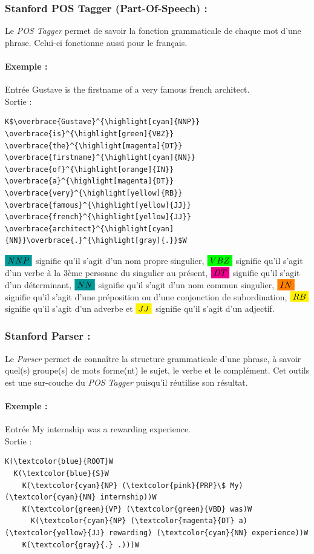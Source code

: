             \subsubsection{Stanford POS Tagger (Part-Of-Speech) :}
                Le \textit{POS Tagger} permet de savoir la fonction grammaticale de chaque mot d'une phrase. Celui-ci fonctionne aussi pour le français.

                \paragraph{Exemple :}
                    Entrée \og Gustave is the firstname of a very famous french architect.\fg\\
                    Sortie :
\begin{lstlisting}
K$\overbrace{Gustave}^{\highlight[cyan]{NNP}} \overbrace{is}^{\highlight[green]{VBZ}} \overbrace{the}^{\highlight[magenta]{DT}} \overbrace{firstname}^{\highlight[cyan]{NN}} \overbrace{of}^{\highlight[orange]{IN}} \overbrace{a}^{\highlight[magenta]{DT}} \overbrace{very}^{\highlight[yellow]{RB}} \overbrace{famous}^{\highlight[yellow]{JJ}} \overbrace{french}^{\highlight[yellow]{JJ}} \overbrace{architect}^{\highlight[cyan]{NN}}\overbrace{.}^{\highlight[gray]{.}}$W
\end{lstlisting}
                \textit{$\highlight[cyan]{NNP}$} signifie qu'il s'agit d'un nom propre singulier, \textit{$\highlight[green]{VBZ}$} signifie qu'il s'agit d'un verbe à la 3ème personne du singulier au présent, \textit{$\highlight[magenta]{DT}$} signifie qu'il s'agit d'un déterminant, \textit{$\highlight[cyan]{NN}$} signifie qu'il s'agit d'un nom commun singulier, \textit{$\highlight[orange]{IN}$} signifie qu'il s'agit d'une préposition ou d'une conjonction de subordination, \textit{$\highlight[yellow]{RB}$} signifie qu'il s'agit d'un adverbe et \textit{$\highlight[yellow]{JJ}$} signifie qu'il s'agit d'un adjectif.

            \subsubsection{Stanford Parser :}
                Le \textit{Parser} permet de connaître la structure grammaticale d'une phrase, à savoir quel(s) groupe(s) de mots forme(nt) le sujet, le verbe et le complément. Cet outils est une sur-couche du \textit{POS Tagger} puisqu'il réutilise son résultat.

                \paragraph{Exemple :}
                Entrée \og My internship was a rewarding experience.\fg\\
                Sortie :
\begin{lstlisting}
K(\textcolor{blue}{ROOT}W
  K(\textcolor{blue}{S}W
    K(\textcolor{cyan}{NP} (\textcolor{pink}{PRP}\$ My) (\textcolor{cyan}{NN} internship))W
    K(\textcolor{green}{VP} (\textcolor{green}{VBD} was)W
      K(\textcolor{cyan}{NP} (\textcolor{magenta}{DT} a) (\textcolor{yellow}{JJ} rewarding) (\textcolor{cyan}{NN} experience))W
    K(\textcolor{gray}{.} .)))W
\end{lstlisting}

